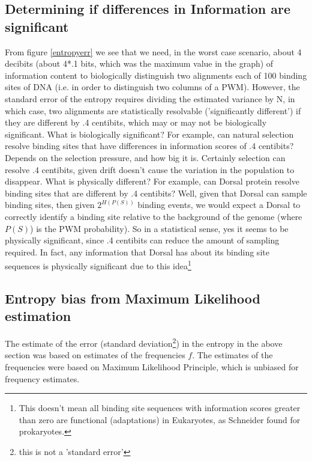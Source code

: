 \subsection{Determining if differences in Information are significant}

From figure \ref{entropyerr} we see that we need, in the worst case scenario, about 4 decibits (about 4*.1 bits, which was the maximum value in the graph) of information content to biologically distinguish two alignments each of 100 binding sites of DNA (i.e. in order to distinguish two columns of a PWM).  However, the standard error of the entropy requires dividing the estimated variance by N, in which case, two alignments are statistically resolvable ('significantly different') if they are different by .4 centibits, which may or may not be biologically significant.  What is biologically significant?  For example, can natural selection resolve binding sites that have differences in information scores of .4 centibits?  Depends on the selection pressure, and how big it is.  Certainly selection can resolve .4 centibits, given drift doesn't cause the variation in the population to disappear.  What is physically different?  For example, can Dorsal protein resolve binding sites that are different by .4 centibits?  Well, given that Dorsal can sample binding sites, then given $2^{H(P(S))}$ binding events, we would expect a Dorsal to correctly identify a binding site relative to the background of the genome (where $P(S)$) is the PWM probability).  So in a statistical sense, yes it seems to be physically significant, since .4 centibits can reduce the amount of sampling required.  In fact, any information that Dorsal has about its binding site sequences is physically significant due to this idea\footnote{This doesn't mean all binding site sequences with information scores greater than zero are functional (adaptations) in Eukaryotes, as Schneider found for prokaryotes\cite{pmid3525846}.}  


\subsection{Entropy bias from Maximum Likelihood estimation}
The estimate of the error (standard deviation\footnote{this is not a 'standard error'}) in the entropy in the above section was based on estimates of the frequencies $f$.  The estimates of the frequencies were based on Maximum Likelihood  Principle, which is unbiased for frequency estimates.  

